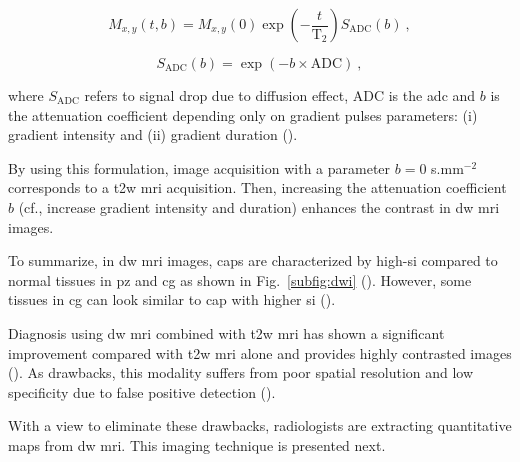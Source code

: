 \begin{enumerate}[leftmargin=*]
\begin{equation}
	M_{x,y}\left(t,b\right) = M_{x,y}(0) \exp \left( - \frac{t}{\text{T}_2} \right) S_{\text{ADC}}(b) \ , 
	\label{eq:t2dif}
\end{equation}

\begin{equation}
	S_{\text{ADC}}(b) = \exp \left( -b \times \text{ADC} \right) \ ,
	\label{eq:dif}
\end{equation}

\noindent where $S_{\text{ADC}}$ refers to signal drop due to diffusion effect, $\text{ADC}$ is the \acl{adc} and $b$ is the attenuation coefficient depending only on gradient pulses parameters: (i) gradient intensity and (ii) gradient duration (\cite{LeBihan1986}).

By using this formulation, image acquisition with a parameter $b=0$ s.mm$^{-2}$ corresponds to a \ac{t2w} \ac{mri} acquisition. Then, increasing the attenuation coefficient $b$ (cf., increase gradient intensity and duration) enhances the contrast in \ac{dw} \ac{mri} images.

To summarize, in \ac{dw} \ac{mri} images, \acp{cap} are characterized by high-\ac{si} compared to normal tissues in \ac{pz} and \ac{cg} as shown in Fig.~\ref{subfig:dwi} (\cite{Barentsz2012}). However, some tissues in \ac{cg} can look similar to \ac{cap} with higher \ac{si} (\cite{Barentsz2012}).

Diagnosis using \ac{dw} \ac{mri} combined with \ac{t2w} \ac{mri} has shown a significant improvement compared with \ac{t2w} \ac{mri} alone and provides highly contrasted images (\cite{Shimofusa2005,Padhani2011,Choi2007}). As drawbacks, this modality suffers from poor spatial resolution and low specificity due to false positive detection (\cite{Choi2007}).

With a view to eliminate these drawbacks, radiologists are extracting quantitative maps from \ac{dw} \ac{mri}. This imaging technique is presented next.


\end{enumerate}
